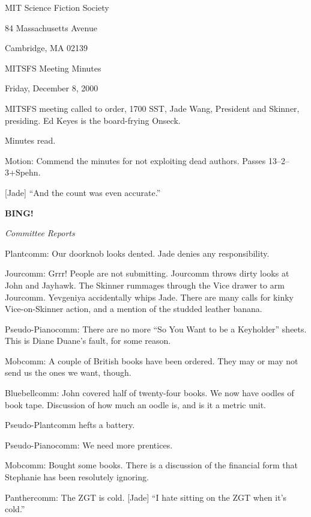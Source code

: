 \documentclass[12pt]{article}
\newcommand{\bing}{{\bf BING!} }
\newcommand{\goto}[1]{\bing \vskip 12pt \centerline{{\em{#1}}}}
\begin{document}
\begin{center}

MIT Science Fiction Society 

84 Massachusetts Avenue

Cambridge, MA 02139

\vspace{12pt}

MITSFS Meeting Minutes 

Friday, December 8, 2000

\end{center}
 
\vspace{18pt}

\setlength{\parskip}{6pt}

\noindent
MITSFS meeting called to order, 1700 SST, Jade Wang, President and
Skinner, presiding.  Ed Keyes is the board-frying Onseck.

Minutes read.

Motion: Commend the minutes for not exploiting dead authors.
Passes 13--2--3+Spehn.

[Jade] ``And the count was even accurate.''

\goto{Committee Reports}

Plantcomm: Our doorknob looks dented.  Jade denies any responsibility.

Jourcomm: Grrr!  People are not submitting.  Jourcomm throws dirty
looks at John and Jayhawk.  The Skinner rummages through the Vice drawer
to arm Jourcomm.  Yevgeniya accidentally whips Jade.  There are many
calls for kinky Vice-on-Skinner action, and a mention of the studded
leather banana.

Pseudo-Pianocomm: There are no more ``So You Want to be a Keyholder''
sheets.  This is Diane Duane's fault, for some reason.

Mobcomm: A couple of British books have been ordered.  They may or
may not send us the ones we want, though.

Bluebellcomm: John covered half of twenty-four books.  We now have
oodles of book tape.  Discussion of how much an oodle is, and is it
a metric unit.

Pseudo-Plantcomm hefts a battery.

Pseudo-Pianocomm: We need more prentices.

Mobcomm: Bought some books.  There is a discussion of the financial
form that Stephanie has been resolutely ignoring.

Panthercomm: The ZGT is cold.  [Jade] ``I hate sitting on the ZGT
when it's cold.''
\end{document}
